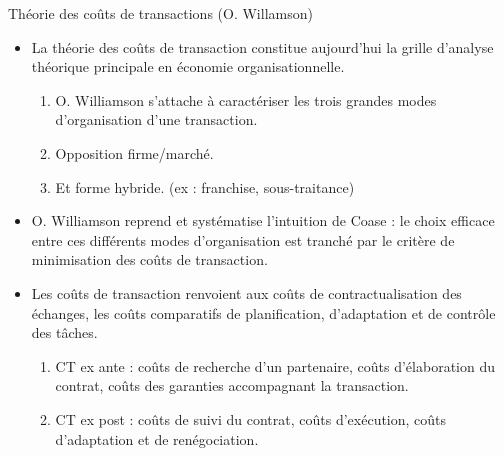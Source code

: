     \begin{frame}[allowframebreaks]{Théorie des coûts de transactions (O. Willamson)}
        \begin{itemize}
            \item La théorie des coûts de transaction constitue aujourd’hui la grille d’analyse théorique principale 
            en économie organisationnelle.
            \begin{enumerate}[$\star$]
            \item O. Williamson s’attache à caractériser les trois grandes modes d’organisation d’une transaction.
            \item Opposition firme/marché.
            \item Et forme hybride. (ex : franchise, sous-traitance)
            \end{enumerate}
            \item  O. Williamson reprend et systématise l’intuition de Coase :
             le choix efficace entre ces différents modes d’organisation est tranché 
             par le critère de minimisation des coûts de transaction.

             \framebreak 

             \item Les coûts de transaction renvoient aux coûts de contractualisation des échanges, 
             les coûts comparatifs de planification, d’adaptation et de contrôle des tâches.
             \begin{enumerate}[$\star$]
              \item CT ex ante : coûts de recherche d’un partenaire, coûts d’élaboration du contrat, coûts des garanties accompagnant la transaction.
             \item CT ex post : coûts de suivi du contrat, coûts d’exécution, coûts d’adaptation et de renégociation.
             \end{enumerate}

             \framebreak


\end{itemize}
\end{frame}
